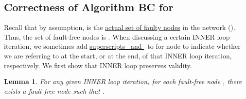 \documentclass[letterpaper, 11pt]{article}
\newcommand{\comment}[1]{}
\newenvironment{proof}{\noindent {\bf Proof:}~}{\hspace*{\fill}}
\newtheorem{claim}{Claim}
\newtheorem{lemma}{Lemma}
\begin{document}
\comment{++++++++++
Appendix \ref{a_claim:S} shows that the required set  exists in both the cases. 

Now, we show the following claim:

\begin{claim}
Each node in set  has enough incoming neighbors in  to perform step (j) of Algorithm BC with .
\end{claim}

\begin{proof}
Consider nodes in set . As shown in Corollary \ref{cor:2f+1} in Section \ref{nec_2},
when , each node in  has at least  incoming neighbors.
Since ,
for each  there must exist at least
 incoming neighbors in . 
Thus, the desired set  exists, satisfying
the requirement in step (j) of Algorithm BC.
\end{proof}

+++++++++++++++}








\subsection{Correctness of Algorithm BC for }
\label{s:correct}

Recall that by assumption,  is the \underline{actual set of faulty nodes} in
the network ().
Thus, the set of fault-free nodes is . When discussing a certain INNER loop iteration, we sometimes add
\underline{superscripts \, and }\, to  for node  to indicate whether we are referring to  at the start, or at the end, of that
INNER loop iteration, respectively. We first show that INNER loop preserves validity.



\begin{lemma}
\label{l_valid_1}
For any given INNER loop iteration, for each fault-free node , there exists a fault-free node  such that . 
\end{lemma}
\end{document}
